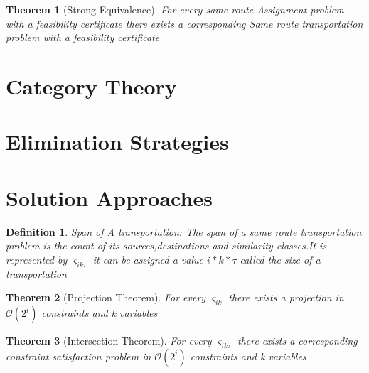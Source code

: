 \documentclass[a4paper]{article}
\newtheorem{definition}{Definition}[section]
\newtheorem{theorem}{Theorem}
\begin{document}
    \begin{theorem}[Strong Equivalence] \label{thm:se}
    For every same route Assignment problem with a feasibility certificate there exists a corresponding Same route transportation problem with a feasibility certificate 
    \end{theorem}
    
    \section{Category Theory}
    
    
    \section{Elimination Strategies}
    
    \section{Solution Approaches}
    \begin{definition}{Span of A transportation:}
    The span of a same route transportation problem is the count of its sources,destinations and similarity classes.It is represented by $\varsigma_{ik\tau}$ it can be assigned a value $i*k*\tau$ called the size of a transportation
    \end{definition}
    
    \begin{theorem}[Projection Theorem] \label{thm:pt}
    For every $\varsigma_{ik}$  there exists a projection in $\mathcal{O}({2^i})$ constraints and k variables 
    \end{theorem}

    \begin{theorem}[Intersection Theorem] \label{thm:it}
    For every $\varsigma_{ik\tau}$  there exists a corresponding constraint satisfaction problem in $\mathcal{O}({2^i})$ constraints and k variables 
    \end{theorem}
    
    
    
    
    

    
        

    
    
    
    
\end{document}
